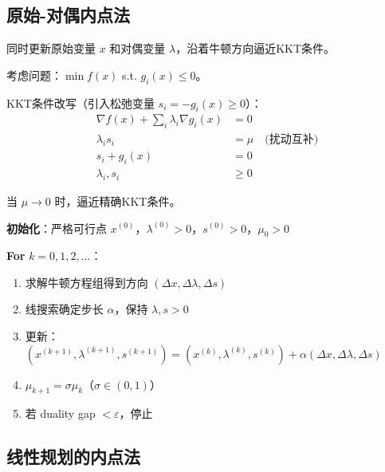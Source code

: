 \subsection{原始-对偶内点法}

\begin{conceptbox}[原始-对偶方法]
同时更新原始变量 $x$ 和对偶变量 $\lambda$，沿着牛顿方向逼近KKT条件。
\end{conceptbox}

考虑问题：$\min f(x)$ s.t. $g_i(x) \leq 0$。

KKT条件改写（引入松弛变量 $s_i = -g_i(x) \geq 0$）：
\begin{align*}
\nabla f(x) + \sum_i \lambda_i \nabla g_i(x) &= 0 \\
\lambda_i s_i &= \mu \quad \text{(扰动互补)} \\
s_i + g_i(x) &= 0 \\
\lambda_i, s_i &\geq 0
\end{align*}

当 $\mu \to 0$ 时，逼近精确KKT条件。

\begin{algobox}[原始-对偶内点法]
\textbf{初始化}：严格可行点 $x^{(0)}$，$\lambda^{(0)} > 0$，$s^{(0)} > 0$，$\mu_0 > 0$

\textbf{For} $k = 0, 1, 2, \ldots$：
\begin{enumerate}
    \item 求解牛顿方程组得到方向 $(\Delta x, \Delta \lambda, \Delta s)$
    \item 线搜索确定步长 $\alpha$，保持 $\lambda, s > 0$
    \item 更新：$(x^{(k+1)}, \lambda^{(k+1)}, s^{(k+1)}) = (x^{(k)}, \lambda^{(k)}, s^{(k)}) + \alpha(\Delta x, \Delta \lambda, \Delta s)$
    \item $\mu_{k+1} = \sigma \mu_k$（$\sigma \in (0,1)$）
    \item 若 duality gap $< \varepsilon$，停止
\end{enumerate}
\end{algobox}

\subsection{线性规划的内点法}

